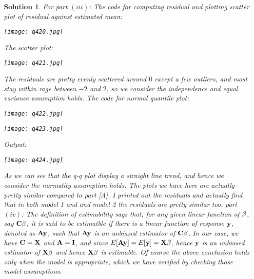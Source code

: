 \documentclass[11pt]{article}
\newtheorem{sol}{Solution}
\begin{document}
\begin{sol}
	For part $(iii)$:\vskip 2mm
	The code for computing residual and plotting scatter plot of residual against estimated mean:
	\begin{center}
		\texttt{[image: q420.jpg]}
	\end{center}
	The scatter plot:
	\begin{center}
		\texttt{[image: q421.jpg]}
	\end{center}
	The residuals are pretty evenly scattered around $0$ except a few outliers, and most stay within rage between $-2$ and $2$, so we consider the independence and equal variance assumption holds.\vskip 2mm
	The code for normal quantile plot:\vskip 2mm
	\begin{center}
		\texttt{[image: q422.jpg]}
	\end{center}
	\begin{center}
		\texttt{[image: q423.jpg]}
	\end{center}
	Output:
	\begin{center}
		\texttt{[image: q424.jpg]}
	\end{center}
	As we can see that the q-q plot display a straight line trend, and hence we consider the normality assumption holds.\vskip 2mm
	The plots we have here are actually pretty similar compared to part [A]. I printed out the residuals and actually find that in both model 1 and and model 2 the residuals are pretty similar too.\vskip 2mm
	part $(iv)$:\vskip 2mm
	The definition of estimability says that, for any given linear function of ${\bf \beta}$, say ${\bf C}{\bf \beta}$, it is said to be estimatble if there is a linear function of response ${\bf y}$, denoted as ${\bf A}{\bf y}$, such that ${\bf A}{\bf y}$ is an unbiased estimator of ${\bf C}{\bf \beta}$.\vskip 2mm
	In our case, we have ${\bf C} = {\bf X}$ and ${\bf A} = {\bf I}$, and since $E[{\bf A}{\bf y}] = E[{\bf y}] = {\bf X}{\bf \beta}$, hence ${\bf y}$ is an unbiased estimator of ${\bf X}{\bf \beta}$ and hence ${\bf X}{\bf \beta}$ is estimable.\vskip 2mm
	Of course the above conclusion holds only when the model is appropriate, which we have verified by checking those model assumptions.
\end{sol}
\end{document}
